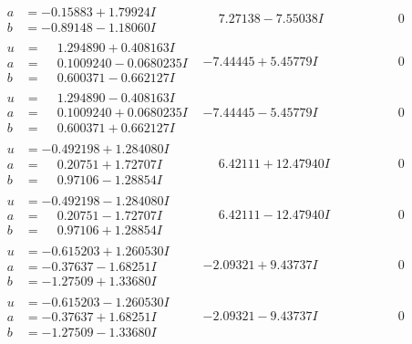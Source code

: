\documentclass[1p]{elsarticle_modified}
\theoremstyle{definition}
\begin{document}
$$\begin{array}{c|c|c}
\begin{aligned}
a &= -0.15883 + 1.79924 I \\
b &= -0.89148 - 1.18060 I\end{aligned}
 & \phantom{-}7.27138 - 7.55038 I & \phantom{-0.000000 } 0 \\ \hline\begin{aligned}
u &= \phantom{-}1.294890 + 0.408163 I \\
a &= \phantom{-}0.1009240 - 0.0680235 I \\
b &= \phantom{-}0.600371 - 0.662127 I\end{aligned}
 & -7.44445 + 5.45779 I & \phantom{-0.000000 } 0 \\ \hline\begin{aligned}
u &= \phantom{-}1.294890 - 0.408163 I \\
a &= \phantom{-}0.1009240 + 0.0680235 I \\
b &= \phantom{-}0.600371 + 0.662127 I\end{aligned}
 & -7.44445 - 5.45779 I & \phantom{-0.000000 } 0 \\ \hline\begin{aligned}
u &= -0.492198 + 1.284080 I \\
a &= \phantom{-}0.20751 + 1.72707 I \\
b &= \phantom{-}0.97106 - 1.28854 I\end{aligned}
 & \phantom{-}6.42111 + 12.47940 I & \phantom{-0.000000 } 0 \\ \hline\begin{aligned}
u &= -0.492198 - 1.284080 I \\
a &= \phantom{-}0.20751 - 1.72707 I \\
b &= \phantom{-}0.97106 + 1.28854 I\end{aligned}
 & \phantom{-}6.42111 - 12.47940 I & \phantom{-0.000000 } 0 \\ \hline\begin{aligned}
u &= -0.615203 + 1.260530 I \\
a &= -0.37637 - 1.68251 I \\
b &= -1.27509 + 1.33680 I\end{aligned}
 & -2.09321 + 9.43737 I & \phantom{-0.000000 } 0 \\ \hline\begin{aligned}
u &= -0.615203 - 1.260530 I \\
a &= -0.37637 + 1.68251 I \\
b &= -1.27509 - 1.33680 I\end{aligned}
 & -2.09321 - 9.43737 I & \phantom{-0.000000 } 0 \\ \hline\begin{aligned}

\end{aligned}
\end{array}$$
\end{document}
